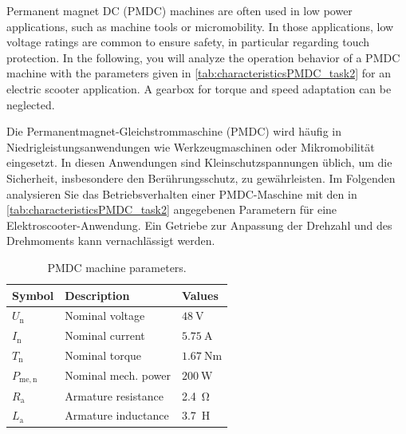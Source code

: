 

Permanent magnet DC (PMDC) machines are often used in low power applications, such as machine tools or micromobility. In those applications, low voltage ratings are common to ensure safety, in particular regarding touch protection. In the following, you will analyze the operation behavior of a PMDC machine with the parameters given in \autoref{tab:characteristicsPMDC_task2} for an electric scooter application. A gearbox for torque and speed adaptation can be neglected.

\begin{germanblock}
    Die Permanentmagnet-Gleichstrommaschine (PMDC) wird häufig in Niedrigleistungsanwendungen wie Werkzeugmaschinen oder Mikromobilität eingesetzt. In diesen Anwendungen sind Kleinschutzspannungen üblich, um die Sicherheit, insbesondere den Berührungsschutz, zu gewährleisten. Im Folgenden analysieren Sie das Betriebsverhalten einer PMDC-Maschine mit den in \autoref{tab:characteristicsPMDC_task2} angegebenen Parametern für eine Elektroscooter-Anwendung. Ein Getriebe zur Anpassung der Drehzahl und des Drehmoments kann vernachlässigt werden.
\end{germanblock}
\begin{table}[htb]
    \caption{PMDC machine parameters.}
    \centering
    \begin{tabular}{lll}\toprule
        Symbol              & Description         & Values                     \\
        \midrule
        $U_{\mathrm{n}}$    & Nominal voltage     & $\SI{48}{\volt}$           \\
        $I_{\mathrm{n}}$    & Nominal current     & $\SI{5.75}{\ampere}$       \\
        $T_{\mathrm{n}}$    & Nominal torque      & $\SI{1.67}{\newton\meter}$ \\
        $P_{\mathrm{me,n}}$ & Nominal mech. power & $\SI{200}{\watt}$          \\
        $R_\mathrm{a}$      & Armature resistance & \SI{2.4}{\ohm}             \\
        $L_\mathrm{a}$      & Armature inductance & \SI{3.7}{\henry}           \\
        \bottomrule
    \end{tabular}
    \label{tab:characteristicsPMDC_task2}
\end{table}



